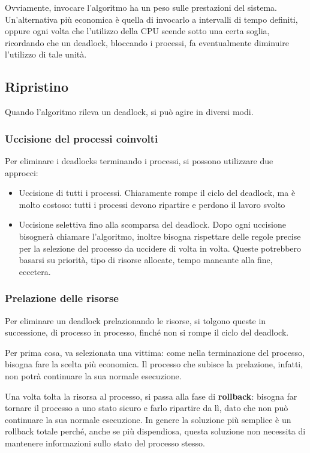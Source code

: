 \documentclass[a4paper]{article}
\begin{document}
Ovviamente, invocare l'algoritmo ha un peso sulle prestazioni del sistema. Un'alternativa più economica è quella di invocarlo a intervalli di tempo definiti, oppure ogni volta che l'utilizzo della CPU scende sotto una certa soglia, ricordando che un deadlock, bloccando i processi, fa eventualmente diminuire l'utilizzo di tale unità.

\subsection{Ripristino}
Quando l'algoritmo rileva un deadlock, si può agire in diversi modi.
\subsubsection{Uccisione del processi coinvolti}
Per eliminare i deadlocks terminando i processi, si possono utilizzare due approcci:
\begin{itemize}
    \item Uccisione di tutti i processi. Chiaramente rompe il ciclo del deadlock, ma è molto costoso: tutti i processi devono ripartire e perdono il lavoro svolto
    \item Uccisione selettiva fino alla scomparsa del deadlock. Dopo ogni uccisione bisognerà chiamare l'algoritmo, inoltre bisogna rispettare delle regole precise per la selezione del processo da uccidere di volta in volta. Queste potrebbero basarsi su priorità, tipo di risorse allocate, tempo mancante  alla fine, eccetera.
\end{itemize}

\subsubsection{Prelazione delle risorse}
Per eliminare un deadlock prelazionando le risorse, si tolgono queste in successione, di processo in processo, finché non si rompe il ciclo del deadlock.

Per prima cosa, va selezionata una vittima: come nella terminazione del processo, bisogna fare la scelta più economica. Il processo che subisce la prelazione, infatti, non potrà continuare la sua normale esecuzione.

Una volta tolta la risorsa al processo, si passa alla fase di \textbf{rollback}: bisogna far tornare il processo a uno stato sicuro e farlo ripartire da lì, dato che non può continuare la sua normale esecuzione. In genere la soluzione più semplice è un rollback totale perché, anche se più dispendiosa, questa soluzione non necessita di mantenere informazioni sullo stato del processo stesso.
\end{document}
